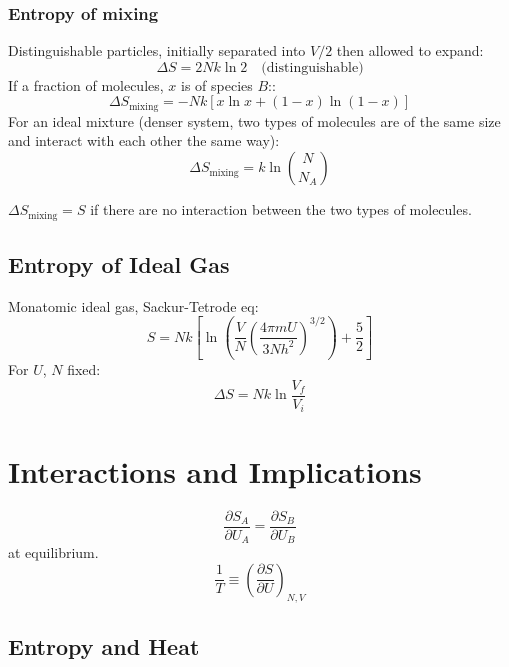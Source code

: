 \documentclass[a4paper,norsk, 10pt]{article}
\begin{document}
\subsubsection*{Entropy of mixing}
Distinguishable particles, initially separated into $V/2$ then allowed to expand:
\begin{equation}
\Delta S=2Nk\ln 2 \quad  (\mathrm{distinguishable)}
\end{equation}
If a fraction of molecules, $x$ is of species $B$::
\begin{equation}
\Delta S_{\mathrm{mixing}}=-Nk\left[x\ln x+(1-x)\ln (1-x)\right]
\end{equation}
For an ideal mixture (denser system, two types of molecules are of the same size and interact with each other the same way):
\begin{equation}
\Delta S_{\mathrm{mixing}}=k\ln {N\choose N_A}
\end{equation}

$\Delta S_{\mathrm{mixing}} = S$ if there are no interaction between the two types of molecules.
\subsection{Entropy of Ideal Gas}
Monatomic ideal gas, Sackur-Tetrode eq:
\begin{equation}
S = Nk\left[\ln\left(\frac{V}{N}\left(\frac{4\pi mU}{3Nh^2}\right)^{3/2}\right) + \frac{5}{2}\right]
\end{equation}
For $U$, $N$ fixed:
\begin{equation}
\Delta S = Nk\ln\frac{V_f}{V_i}
\end{equation}
\section{Interactions and Implications}
\begin{equation}
\frac{\partial S_A}{\partial U_A} = \frac{\partial S_B}{\partial U_B}
\end{equation}
at equilibrium.
\begin{equation}
\frac{1}{T}\equiv \left(\frac{\partial S}{\partial U}\right)_{N,V}
\end{equation}
\subsection{Entropy and Heat}
\end{document}
